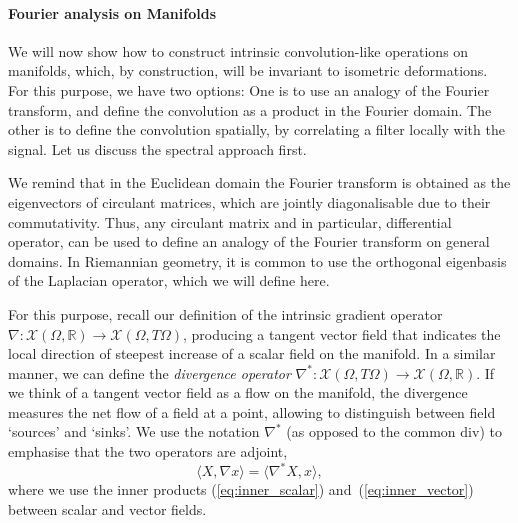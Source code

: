 \paragraph{Fourier analysis on Manifolds}
%
We will now show how to construct intrinsic convolution-like operations on manifolds, which, by construction, will be invariant to isometric deformations.    
For this purpose, 
we have two options: One is to use an analogy of the Fourier transform, and define the convolution as a product in the Fourier domain. 
%
The other is to define the convolution spatially, by correlating a filter locally with the signal. 
Let us discuss the spectral approach first.


We remind that in the Euclidean domain the Fourier transform is obtained as the eigenvectors of circulant matrices, which are jointly diagonalisable due to their commutativity. Thus, any circulant matrix and in particular, differential operator, can be used to define an analogy of the Fourier transform on general domains. 
%
In Riemannian geometry, it is common to use the orthogonal eigenbasis of the Laplacian operator, which we will define here. 


For this purpose, recall our definition of the intrinsic gradient operator $\nabla : \mathcal{X}(\Omega,\mathbb{R}) \rightarrow \mathcal{X}(\Omega,T\Omega)$, 
producing a tangent vector field that indicates the local direction of steepest increase of a scalar field on the manifold. 
%
In a similar manner, we can define the {\em divergence operator} $\nabla^* : \mathcal{X}(\Omega,T\Omega) \rightarrow \mathcal{X}(\Omega,\mathbb{R})$. 
%
If we think of a tangent vector field as a
flow on the manifold, the divergence measures
the net flow of a field at a point, allowing to distinguish
between field `sources' and `sinks'. 
%
We use the notation $\nabla^*$ (as opposed to the common $\mathrm{div}$) to emphasise that the two operators are adjoint,
$$
\langle X, \nabla x\rangle = \langle \nabla^* X,  x\rangle,
$$
where we use the inner products (\ref{eq:inner_scalar}) and~(\ref{eq:inner_vector}) between scalar and vector fields. 

